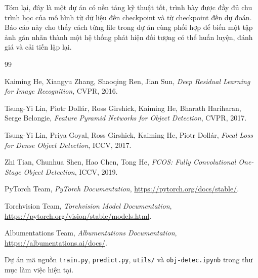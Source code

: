 \documentclass[12pt,a4paper]{article}
\begin{document}
Tóm lại, đây là một dự án có nền tảng kỹ thuật tốt, trình bày được đầy đủ chu trình học của mô hình từ dữ liệu đến checkpoint và từ checkpoint đến dự đoán. Báo cáo này cho thấy cách từng file trong dự án cùng phối hợp để biến một tập ảnh gán nhãn thành một hệ thống phát hiện đối tượng có thể huấn luyện, đánh giá và cải tiến lặp lại.

\clearpage
{}
\begin{thebibliography}{99}

Kaiming He, Xiangyu Zhang, Shaoqing Ren, Jian Sun,
\textit{Deep Residual Learning for Image Recognition},
CVPR, 2016.

Tsung-Yi Lin, Piotr Dollár, Ross Girshick, Kaiming He, Bharath Hariharan, Serge Belongie,
\textit{Feature Pyramid Networks for Object Detection},
CVPR, 2017.

Tsung-Yi Lin, Priya Goyal, Ross Girshick, Kaiming He, Piotr Dollár,
\textit{Focal Loss for Dense Object Detection},
ICCV, 2017.

Zhi Tian, Chunhua Shen, Hao Chen, Tong He,
\textit{FCOS: Fully Convolutional One-Stage Object Detection},
ICCV, 2019.

PyTorch Team,
\textit{PyTorch Documentation},
\url{https://pytorch.org/docs/stable/}.

Torchvision Team,
\textit{Torchvision Model Documentation},
\url{https://pytorch.org/vision/stable/models.html}.

Albumentations Team,
\textit{Albumentations Documentation},
\url{https://albumentations.ai/docs/}.

Dự án mã nguồn \texttt{train.py}, \texttt{predict.py}, \texttt{utils/} và \texttt{obj-detec.ipynb}
trong thư mục làm việc hiện tại.

\end{thebibliography}
\end{document}
